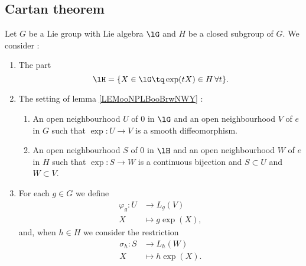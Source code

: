 \subsection{Cartan theorem}

\begin{propositionDef}	\label{PROPooZIKNooEdCqRB}
	Let \( G\) be a Lie group with Lie algebra \( \lG\) and \( H\) be a closed subgroup of \( G\). We consider :
	\begin{enumerate}

		\item
		      The part
		      \begin{equation}		\label{EQooBROMooIQArCm}
			      \lH=\{ X\in\lG\tq \exp(tX)\in H\,\forall t \}.
		      \end{equation}
		\item
		      The setting of lemma \ref{LEMooNPLBooBrwNWY} :
		      \begin{enumerate}
			      \item
			            An open neighbourhood \( U\) of \( 0\) in \( \lG\) and an open neighbourhood \( V\) of \( e\) in \( G\) such that \(\exp \colon U\to V  \) is a smooth diffeomorphism.
			      \item
			            An open neighbourhood \( S\) of \( 0\) in \( \lH\) and an open neighbourhood \( W\) of \( e\) in \( H\) such that \(\exp \colon S\to W  \) is a continuous bijection and \( S\subset U\) and \( W\subset V\).
		      \end{enumerate}
		\item
		      For each \( g\in G\) we define
		      \begin{equation}
			      \begin{aligned}
				      \varphi_g\colon U & \to L_g(V)        \\
				      X                 & \mapsto g\exp(X),
			      \end{aligned}
		      \end{equation}
		      and, when \( h\in H\) we consider the restriction
		      \begin{equation}
			      \begin{aligned}
				      \sigma_h\colon S & \to L_h(W)        \\
				      X                & \mapsto h\exp(X).
			      \end{aligned}

\end{equation}
\end{enumerate}
\end{propositionDef}
